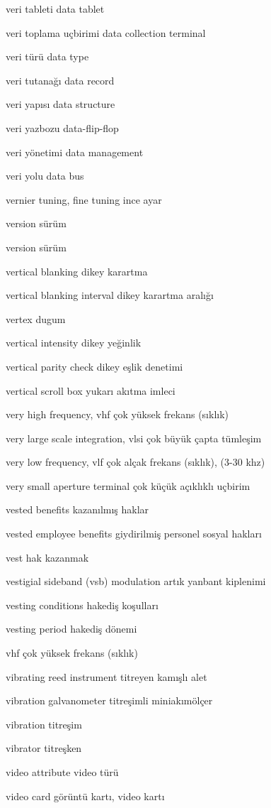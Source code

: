 \documentclass[12pt,fleqn]{article}\usepackage{../../common}
\begin{document}
veri tableti data tablet

veri toplama uçbirimi data collection terminal

veri türü data type

veri tutanağı data record

veri yapısı data structure

veri yazbozu data-flip-flop

veri yönetimi data management

veri yolu data bus

vernier tuning, fine tuning ince ayar

version sürüm

version sürüm

vertical blanking dikey karartma

vertical blanking interval dikey karartma aralığı

vertex dugum 

vertical intensity dikey yeğinlik

vertical parity check dikey eşlik denetimi

vertical scroll box yukarı akıtma imleci

very high frequency, vhf çok yüksek frekans (sıklık)

very large scale integration, vlsi çok büyük çapta tümleşim

very low frequency, vlf çok alçak frekans (sıklık), (3-30 khz)

very small aperture terminal çok küçük açıklıklı uçbirim

vested benefits kazanılmış haklar

vested employee benefits giydirilmiş personel sosyal hakları

vest hak kazanmak

vestigial sideband (vsb) modulation artık yanbant kiplenimi

vesting conditions hakediş koşulları

vesting period hakediş dönemi

vhf çok yüksek frekans (sıklık)

vibrating reed instrument titreyen kamışlı alet

vibration galvanometer titreşimli miniakımölçer

vibration titreşim

vibrator titreşken

video attribute video türü

video card görüntü kartı, video kartı
\end{document}
